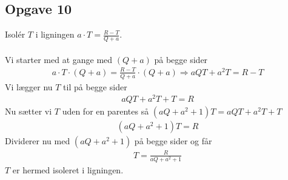 \subsection{Opgave 10}

Isolér $T$ i ligningen $a\cdot T = \frac{R-T}{Q+a}$.\\\\

\ans
Vi starter med at gange med $(Q+a)$ på begge sider
\begin{align*}
    a\cdot T \cdot (Q+a) = \frac{R-T}{Q+a}\cdot (Q+a) \Longrightarrow aQT + a^2T = R-T
\end{align*}
Vi lægger nu $T$ til på begge sider
\begin{align*}
    aQT + a^2T + T = R 
\end{align*}
Nu sætter vi $T$ uden for en parentes så $(aQ + a^2 + 1)T = aQT + a^2T + T$
\begin{align*}
    (aQ + a^2 + 1)T = R
\end{align*}
Dividerer nu med $(aQ + a^2 + 1)$ på begge sider og får
\begin{align*}
    T = \frac{R}{aQ + a^2 + 1}
\end{align*}
$T$ er hermed isoleret i ligningen.